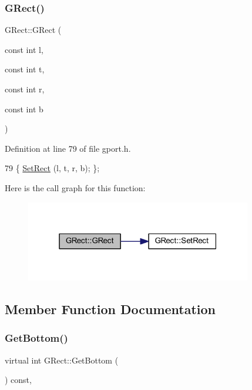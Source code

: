 \subsubsection{\texorpdfstring{G\+Rect()}{GRect()}\hspace{0.1cm}{\footnotesize\ttfamily [2/2]}}
{\footnotesize\ttfamily G\+Rect\+::\+G\+Rect (\begin{DoxyParamCaption}\item[{const int}]{l,  }\item[{const int}]{t,  }\item[{const int}]{r,  }\item[{const int}]{b }\end{DoxyParamCaption})\hspace{0.3cm}{\ttfamily [inline]}}



Definition at line 79 of file gport.\+h.


\begin{DoxyCode}
79 \{ \mbox{\hyperlink{class_g_rect_a1fd6fd632b6d3c068382766a0c18340f}{SetRect}} (l, t, r, b); \};
\end{DoxyCode}
Here is the call graph for this function\+:\nopagebreak
\begin{figure}[H]
\begin{center}
\leavevmode
\includegraphics[width=280pt]{class_g_rect_a56121bc9d4825b0f9200a78d29357b71_cgraph}
\end{center}
\end{figure}


\subsection{Member Function Documentation}
\mbox{\label{class_g_rect_a7c08ca62e8fbad3cfa1724384ee4921d}} 
\subsubsection{\texorpdfstring{Get\+Bottom()}{GetBottom()}}
{\footnotesize\ttfamily virtual int G\+Rect\+::\+Get\+Bottom (\begin{DoxyParamCaption}{ }\end{DoxyParamCaption}) const\hspace{0.3cm}{\ttfamily [inline]}, {\ttfamily [virtual]}}



